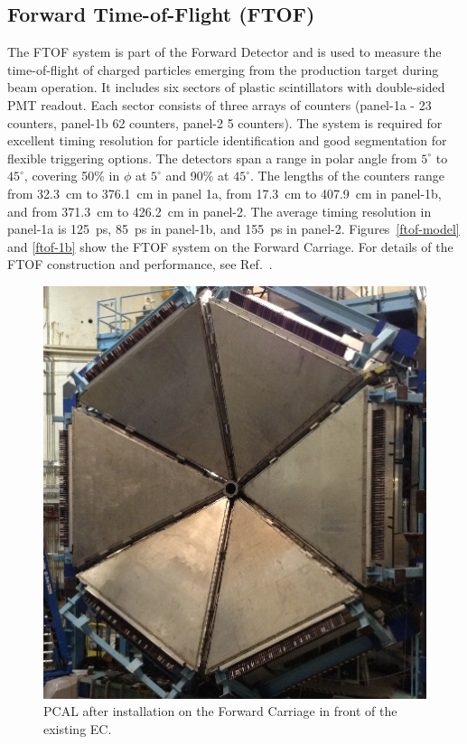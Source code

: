 \documentclass[final,3p,twocolumn]{elsarticle}
\begin{document}
\subsection{Forward Time-of-Flight (FTOF)}
\label{ftof}

The FTOF system is part of the Forward Detector and is used to measure the time-of-flight of charged particles 
emerging from the production target during beam operation. It includes six sectors of plastic scintillators with 
double-sided PMT readout. Each sector consists of three arrays of counters (panel-1a - 23 counters, panel-1b 62
counters, panel-2 5 counters). The system is required for excellent timing resolution for particle identification and
good segmentation for flexible triggering options. The detectors span a range in polar angle from $5^\circ$ to
$45^\circ$, covering 50\% in $\phi$ at $5^\circ$ and 90\% at $45^\circ$. The lengths of the counters range from
32.3~cm to 376.1~cm in panel 1a, from 17.3~cm to 407.9~cm in panel-1b, and from 371.3~cm to 426.2~cm in panel-2.
The average timing resolution in panel-1a is 125~ps, 85~ps in panel-1b, and 155~ps in panel-2.
Figures~\ref{ftof-model} and \ref{ftof-1b} show the FTOF system on the Forward Carriage. For details of the
FTOF construction and performance, see Ref.~\cite{FTOF}. 

\begin{figure}[htbp!]
\centerline{\includegraphics[width=0.95\columnwidth]{PCAL.png}}
\caption{PCAL after installation on the Forward Carriage in front of the existing EC.}
\label{ec-pcal}
\end{figure}
\end{document}
